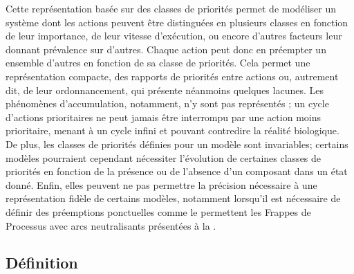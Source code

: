 Cette représentation basée sur des classes de priorités permet de modéliser un système
dont les actions peuvent être distinguées en plusieurs classes en fonction de leur importance,
de leur vitesse d'exécution, ou encore d'autres facteurs leur donnant prévalence sur d'autres.
Chaque action peut donc en préempter un ensemble d'autres en fonction de sa classe de priorités.
Cela permet une représentation compacte, des rapports de priorités entre actions
ou, autrement dit, de leur ordonnancement,
qui présente néanmoins quelques lacunes.
Les phénomènes d'accumulation, notamment, n'y sont pas représentés ;
un cycle d'actions prioritaires ne peut jamais être interrompu par une action moins prioritaire,
menant à un cycle infini et pouvant contredire la réalité biologique.
De plus, les classes de priorités définies pour un modèle sont invariables;
certains modèles pourraient cependant nécessiter l'évolution de certaines classes de priorités
en fonction de la présence ou de l'absence d'un composant dans un état donné.
Enfin, elles peuvent ne pas permettre la précision nécessaire à une représentation fidèle de
certains modèles, notamment lorsqu'il est nécessaire de définir des préemptions ponctuelles
comme le permettent les Frappes de Processus avec arcs neutralisants
présentées à la .




\subsection{Définition}

